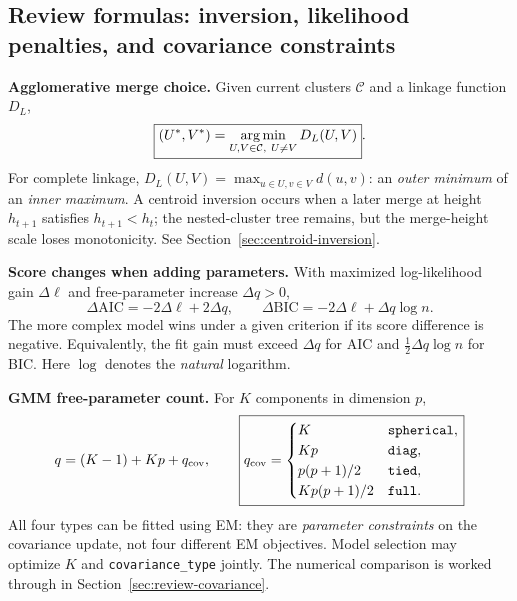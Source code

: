 \subsection{Review formulas: inversion, likelihood penalties, and covariance constraints}
\textbf{Agglomerative merge choice.} Given current clusters $\mathcal C$ and a linkage function $D_L$,
\[
\boxed{(U^*,V^*)=\operatorname*{arg\,min}_{U,V\in\mathcal C,\ U\ne V}D_L(U,V)}.
\]
For complete linkage, $D_L(U,V)=\max_{u\in U,v\in V}d(u,v)$: an \emph{outer minimum} of an \emph{inner maximum}. A centroid inversion occurs when a later merge at height $h_{t+1}$ satisfies $h_{t+1}<h_t$; the nested-cluster tree remains, but the merge-height scale loses monotonicity. See Section~\ref{sec:centroid-inversion}.

\textbf{Score changes when adding parameters.} With maximized log-likelihood gain $\Delta\ell$ and free-parameter increase $\Delta q>0$,
\[
\boxed{\Delta\mathrm{AIC}=-2\Delta\ell+2\Delta q},\qquad
\boxed{\Delta\mathrm{BIC}=-2\Delta\ell+\Delta q\log n}.
\]
The more complex model wins under a given criterion if its score difference is negative. Equivalently, the fit gain must exceed $\Delta q$ for AIC and $\frac12\Delta q\log n$ for BIC. Here $\log$ denotes the \emph{natural} logarithm.

\textbf{GMM free-parameter count.} For $K$ components in dimension $p$,
\[
q=(K-1)+Kp+q_{\rm cov},\qquad
\boxed{q_{\rm cov}=\begin{cases}
K&\texttt{spherical},\\
Kp&\texttt{diag},\\
p(p+1)/2&\texttt{tied},\\
Kp(p+1)/2&\texttt{full}.
\end{cases}}
\]
All four types can be fitted using EM: they are \emph{parameter constraints} on the covariance update, not four different EM objectives. Model selection may optimize $K$ and \texttt{covariance\_type} jointly. The numerical comparison is worked through in Section~\ref{sec:review-covariance}.

